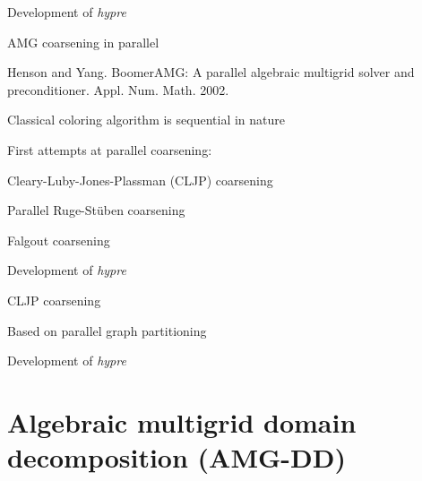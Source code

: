 \documentclass[18pt,xcolor=table]{beamer}
\begin{document}
\begin{frame}{Development of \emph{hypre}}
\begin{block}{AMG coarsening in parallel}
\bit
\item Henson and Yang. BoomerAMG: A parallel algebraic multigrid solver and preconditioner. Appl. Num. Math. 2002.
\item Classical coloring algorithm is sequential in nature
\item First attempts at parallel coarsening:
\bit
\item Cleary-Luby-Jones-Plassman (CLJP) coarsening
\item Parallel Ruge-St\"uben coarsening
\item Falgout coarsening
\eit
\eit
\end{block}
\end{frame}

\begin{frame}{Development of \emph{hypre}}
\begin{block}{CLJP coarsening}
\bit
\item Based on parallel graph partitioning
\eit
\end{block}
\end{frame}

\begin{frame}{Development of \emph{hypre}}
\begin{block}{}
\bit
\item 
\eit
\end{block}
\end{frame}







\section{Algebraic multigrid domain decomposition (AMG-DD)}
\end{document}
